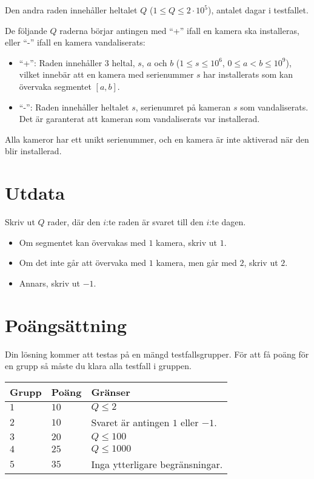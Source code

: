 Den andra raden innehåller heltalet $Q$ ($1 \le Q \le 2 \cdot 10^5$), antalet dagar i testfallet.

De följande $Q$ raderna börjar antingen med ``+'' ifall en kamera ska installeras, eller ``-'' ifall en kamera vandaliserats:
\begin{itemize}
  \item ``+'': Raden innehåller $3$ heltal, $s$, $a$ och $b$ ($1\le s \le 10^6$, $0\le a < b \le 10^9$), 
  vilket innebär att en kamera med serienummer $s$ har installerats som kan övervaka segmentet $[a,b]$.
  \item ``-'': Raden innehåller heltalet $s$, serienumret på kameran $s$ som vandaliserats.
  Det är garanterat att kameran som vandaliserats var installerad.
\end{itemize}

Alla kameror har ett unikt serienummer, och en kamera är inte aktiverad när den blir installerad.

\section*{Utdata}
Skriv ut $Q$ rader, där den $i$:te raden är svaret till den $i$:te dagen.
\begin{itemize}
  \item Om segmentet kan övervakas med $1$ kamera, skriv ut $1$.
  \item Om det inte går att övervaka med $1$ kamera, men går med $2$, skriv ut $2$.
  \item Annars, skriv ut $-1$.
\end{itemize}

\section*{Poängsättning}
Din lösning kommer att testas på en mängd testfallsgrupper.
För att få poäng för en grupp så måste du klara alla testfall i gruppen.

\noindent
\begin{tabular}{| l | l | p{12cm} |}
  \hline
  \textbf{Grupp} & \textbf{Poäng} & \textbf{Gränser} \\ \hline
  $1$    & $10$       & $Q \le 2$ \\ \hline
  $2$    & $10$       & Svaret är antingen $1$ eller $-1$. \\ \hline
  $3$    & $20$       & $Q \le 100$ \\ \hline
  $4$    & $25$       & $Q \le 1000$ \\ \hline
  $5$    & $35$       & Inga ytterligare begränsningar. \\ \hline
\end{tabular}

